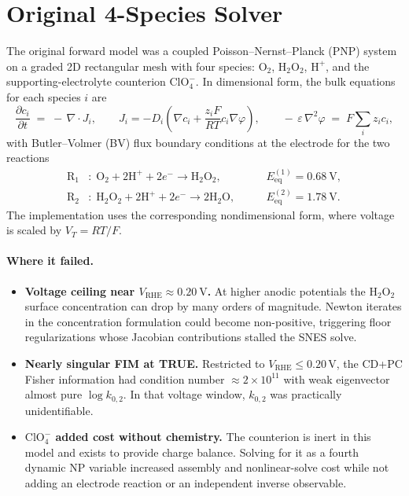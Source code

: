 \documentclass[11pt]{article}
\newcommand{\Eeq}{E_{\mathrm{eq}}}
\newcommand{\VRHE}{V_{\mathrm{RHE}}}
\newcommand{\VT}{V_{T}}
\begin{document}
\section{Original 4-Species Solver}
The original forward model was a coupled Poisson--Nernst--Planck (PNP)
system on a graded 2D rectangular mesh with four species:
$\mathrm{O}_2$, $\mathrm{H}_2\mathrm{O}_2$, $\mathrm{H}^{+}$, and the
supporting-electrolyte counterion $\mathrm{ClO}_4^{-}$. In dimensional form,
the bulk equations for each species $i$ are
\begin{equation}
  \frac{\partial c_i}{\partial t}
  \;=\;
  -\,\nabla\!\cdot J_i,
  \qquad
  J_i = -D_i\left(\nabla c_i + \frac{z_i F}{RT}c_i\nabla\varphi\right),
  \qquad
  -\,\varepsilon\,\nabla^{2}\varphi \;=\; F\sum_i z_i c_i,
  \label{eq:pnp-orig}
\end{equation}
with Butler--Volmer (BV) flux boundary conditions at the electrode for the
two reactions
\begin{align}
  \mathrm{R}_1\!&: \;\mathrm{O}_2 + 2\mathrm{H}^{+} + 2e^{-}
                       \to \mathrm{H}_2\mathrm{O}_2,
  \qquad &\Eeq^{(1)} = \SI{0.68}{\volt}, \\
  \mathrm{R}_2\!&: \;\mathrm{H}_2\mathrm{O}_2 + 2\mathrm{H}^{+} + 2e^{-}
                       \to 2\mathrm{H}_2\mathrm{O},
  \qquad &\Eeq^{(2)} = \SI{1.78}{\volt}.
\end{align}
The implementation uses the corresponding nondimensional form, where voltage
is scaled by $\VT = RT/F$.

\paragraph{Where it failed.}
\begin{itemize}
  \item \textbf{Voltage ceiling near $\VRHE \approx \SI{+0.20}{\volt}$.} At
        higher anodic potentials the $\mathrm{H}_2\mathrm{O}_2$ surface
        concentration can drop by many orders of magnitude. Newton iterates in
        the concentration formulation could become non-positive, triggering
        floor regularizations whose Jacobian contributions stalled the SNES
        solve.
  \item \textbf{Nearly singular FIM at TRUE.} Restricted to
        $\VRHE \le 0.20$\,V, the CD+PC Fisher information had condition number
        $\approx 2\times 10^{11}$ with weak eigenvector almost pure
        $\log k_{0,2}$. In that voltage window, $k_{0,2}$ was practically
        unidentifiable.
  \item \textbf{$\mathrm{ClO}_4^{-}$ added cost without chemistry.} The
        counterion is inert in this model and exists to provide charge balance.
        Solving for it as a fourth dynamic NP variable increased assembly and
        nonlinear-solve cost while not adding an electrode reaction or an
        independent inverse observable.
\end{itemize}
\end{document}

